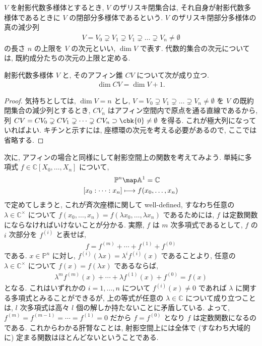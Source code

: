 \documentclass[openany, a4paper, oneside]{jsbook}
\begin{document}
\begin{defn}[射影代数的集合の次元]
$V$ を射影代数多様体とするとき, $V$ のザリスキ閉集合は, それ自身が射影代数多様体であるときに $V$ の閉部分多様体であるという.
$V$ のザリスキ閉部分多様体の真の減少列
\begin{align}
 V=V_0 \supsetneq V_1 \supsetneq V_1 \supsetneq \dots \supsetneq V_n \neq \emptyset
\end{align}
の長さ $n$ の上限を $V$ の次元といい,  $\dim V$ で表す.
代数的集合の次元については, 既約成分たちの次元の上限と定める. \fin
\end{defn}
\begin{prop}
射影代数多様体 $V$ と, そのアフィン錐 $CV$ について次が成り立つ.
\begin{align}
 \dim CV
 =
 \dim V + 1.
\end{align}
\fin
\end{prop}
\begin{proof}
気持ちとしては, $\dim V = n$ とし,
$V=V_0 \supsetneq V_1 \supsetneq \dots \supsetneq V_n \neq \emptyset$ を $V$ の既約閉集合の減少列とするとき,
$CV_n$ はアフィン空間内で原点を通る直線であるから, 列
$CV=CV_0 \supsetneq CV_1 \supsetneq \dots \supsetneq CV_n \supset \cbk{0} \neq \emptyset$ を得る.
これが極大列になっていればよい.
キチンと示すには, 座標環の次元を考える必要があるので, ここでは省略する.
\end{proof}

次に, アフィンの場合と同様にして射影空間上の関数を考えてみよう.
単純に多項式 $f \in \mathbb{C}[X_0,\dots,X_n]$ について,
\begin{align}
 \mathbb{P}^n
 &\map
 \mathbb{A}^1
 = \mathbb{C} \\
 [x_0:\dots:x_n]
 &\longmapsto
 f(x_0,\dots,x_n)
\end{align}
で定めてしまうと, これが斉次座標に関して well-defined,
すなわち任意の $\lambda \in \mathbb{C}^{\times}$ について
$f(x_0,\dots,x_n) = f (\lambda x_0,\dots,\lambda x_n)$ であるためには,
$f$ は定数関数にならなければいけないことが分かる.
実際, $f$ は $m$ 次多項式であるとして, $f$ の $i$ 次部分を $f^{(i)}$ と表せば,
\begin{align}
 f
 =
 f^{(m)} + \cdots + f^{(1)} + f^{(0)}
\end{align}
である.
$x \in \mathbb{P}^n$ に対し, $f^{(i)}(\lambda x) = \lambda^i f^{(i)}(x)$ であることより,
任意の $\lambda \in \mathbb{C}^{\times}$ について $f (x) = f (\lambda x)$ であるならば,
\begin{align}
 \lambda^m f^{(m)}(x) + \cdots + \lambda f^{(1)}(x) + f^{(0)}
 =
 f (x)
\end{align}
となる.
これはいずれかの $i =1,\dots,n$ について $f^{(i)}(x) \neq 0$ であれば $\lambda$ に関する多項式とみることができるが,
上の等式が任意の $\lambda \in \mathbb{C}$ について成り立つことは,
$l$ 次多項式は高々 $l$ 個の解しか持たないことに矛盾している.
よって, $f^{(m)} = f^{(m-1)} = \cdots = f^{(1)} = 0$ だから  $f=f^{(0)}$ となり $f$ は定数関数になるのである.
これからわかる肝腎なことは, 射影空間上には全体で (すなわち大域的に) 定まる関数はほとんどないということである.
\end{document}
